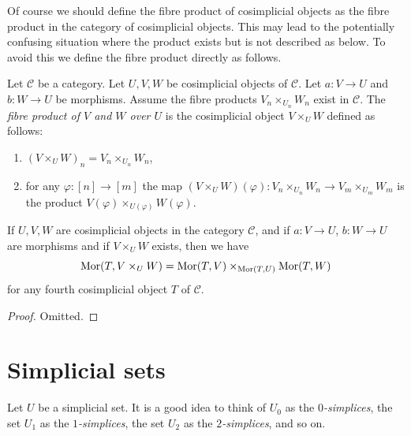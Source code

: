\noindent
Of course we should define the fibre product of cosimplicial objects
as the fibre product in the category of cosimplicial objects. This
may lead to the potentially confusing situation where the product exists
but is not described as below. To avoid this we define the fibre product
directly as follows.

\begin{definition}
\label{definition-fibre-product-cosimplicial-objects}
Let $\mathcal{C}$ be a category.
Let $U, V, W$ be cosimplicial objects of $\mathcal{C}$.
Let $a : V \to U$ and $b : W \to U$ be morphisms.
Assume the fibre products $V_n \times_{U_n} W_n$ exist in $\mathcal{C}$.
The {\it fibre product of $V$ and $W$ over $U$} is the cosimplicial object
$V \times_U W$ defined as follows:
\begin{enumerate}
\item $(V \times_U W)_n = V_n \times_{U_n} W_n$,
\item for any $\varphi : [n] \to [m]$ the map
$(V \times_U W)(\varphi) : V_n \times_{U_n} W_n \to V_m \times_{U_m} W_m$
is the product $V(\varphi) \times_{U(\varphi)} W(\varphi)$.
\end{enumerate}
\end{definition}

\begin{lemma}
\label{lemma-fibre-product-cosimplicial-objects}
If $U, V, W$ are cosimplicial objects in the category $\mathcal{C}$,
and if $a : V \to U$, $b : W \to U$ are morphisms
and if $V \times_U W$ exists, then we have
$$
\mathop{\mathrm{Mor}}\nolimits(T, V \times_U W) =
\mathop{\mathrm{Mor}}\nolimits(T, V) \times_{\mathop{\mathrm{Mor}}\nolimits(T, U)}
\mathop{\mathrm{Mor}}\nolimits(T, W)
$$
for any fourth cosimplicial object $T$ of $\mathcal{C}$.
\end{lemma}

\begin{proof}
Omitted.
\end{proof}














\section{Simplicial sets}
\label{section-simplicial-set}

\noindent
Let $U$ be a simplicial set. It is a good idea to think of
$U_0$ as the {\it $0$-simplices}, the set $U_1$ as the
{\it $1$-simplices},
the set $U_2$ as the {\it $2$-simplices}, and so on.

